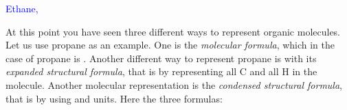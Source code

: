 \documentclass[main.tex]{subfiles}
\begin{document}
\begin{description}
\begin{center} \hspace{0.5cm}\textcolor{blue}{Ethane, }\end{center}
At this point you have seen three different ways to represent organic molecules. Let us use propane as an example. One is the  \emph{molecular formula}, which in the case of propane is . Another different way to represent propane is with its \emph{expanded structural formula}, that is by representing all C and all H in the molecule. Another molecular representation is the \emph{condensed structural formula}, that is by using  and  units. Here the three formulas:
\begin{center}\end{center}












\begin{figure}[h] %


\end{figure}
\end{description}
\end{document}
